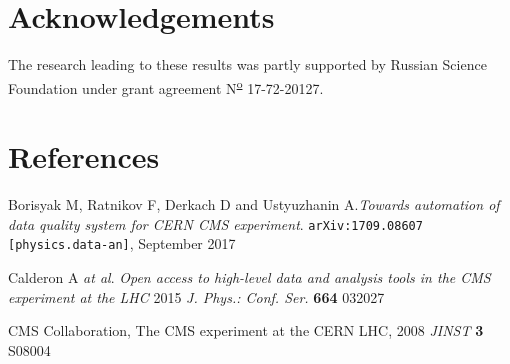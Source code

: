 \documentclass[a4paper]{jpconf}
\begin{document}
\section*{Acknowledgements}
The research leading to these results was partly supported by Russian Science Foundation under grant agreement N\textsuperscript{\underline{\scriptsize o}} 17-72-20127.

\section*{References}
\begin{thebibliography}{3}
\item Borisyak M, Ratnikov F, Derkach D and Ustyuzhanin A.{\it Towards automation of data quality system for CERN CMS experiment}.  {\tt arXiv:1709.08607 [physics.data-an]}, September 2017

\item  Calderon A {\it at al}. {\it Open access to high-level data and analysis tools in the CMS experiment at the LHC} 2015 {\it J. Phys.: Conf. Ser.} {\bf 664} 032027

\item  CMS Collaboration, The CMS experiment at the CERN LHC, 2008 {\it JINST} {\bf 3} S08004
\end{thebibliography}
\end{document}
